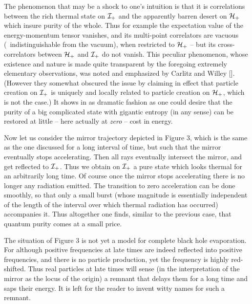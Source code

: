 The phenomenon that may be
a shock to one's intuition
is that
it is correlations between the rich thermal state on
${\cal I}_+$ and the
apparently barren desert on ${\cal H}_+$
which insure purity of the whole.  Thus for example the
expectation value of the energy-momentum tensor vanishes,
and its multi-point correlators are vacuous (\ie\ indistinguishable
from the vacuum),
when restricted to
${\cal H}_+$ -- but its cross-correlators between ${\cal H}_+$ and
${\cal I}_+$ do not vanish.
This peculiar phenomenon, whose existence and nature is made quite
transparent by the foregoing extremely elementary observations,
was noted and emphasized by
Carlitz and Willey [\carlitz].
(However they somewhat obscured the issue by claiming
in effect
that particle creation on ${\cal I}_+$ is uniquely and locally
related
to particle creation on ${\cal H}_+$, which is not
the case.)
It shows in as dramatic fashion as one could desire
that the purity of a big complicated state with gigantic entropy
(in any sense) can be restored at little -- here
actually at {\it zero\/}
-- cost in energy.

Now let us consider the mirror trajectory
depicted in Figure 3, which is the same as the one discussed
for a long interval of time, but such that the mirror eventually
stops accelerating.  Then all rays eventually intersect the
mirror, and get reflected to ${\cal I}_+$.  Thus we obtain on
${\cal I}_+$ a pure state which looks thermal for
an arbitrarily long time.  Of course once the mirror stops accelerating
there is no longer any radiation emitted.  The transition to
zero acceleration can be done smoothly, so that only a small burst
(whose magnitude is essentially independent of the
length of the interval over
which thermal radiation has occurred)
accompanies it.  Thus altogether one finds, similar to the
previous case, that quantum purity comes at a small price.

The situation of Figure 3 is not yet a
model for
complete black hole evaporation.  For although
positive frequencies at late times are indeed reflected into positive
frequencies, and there is no particle production, yet the frequency
is highly red-shifted.  Thus real particles at late times will sense
(in the interpretation of the mirror as the locus of the
origin) a remnant that
delays them for a long time and saps their energy.  It is
left for the reader
to invent witty names for such a remnant.


